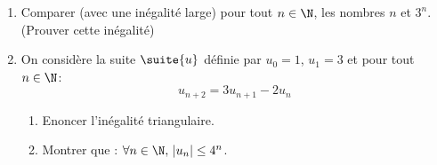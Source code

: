 


\begin{exercice}
\begin{enumerate}
\item Comparer (avec une inégalité large) pour tout $n\in \N$, les nombres $n$ et $ 3^n$. (Prouver cette inégalité) 
\item On considère la suite $\suite{u}$ définie par $u_0=1$, $u_1= 3$  et pour tout $n\in \N$:
$$u_{n+2} =3u_{n+1} -2u_n$$
\begin{enumerate}
\item Enoncer l'inégalité triangulaire.
\item Montrer que  : $\forall n\in \N,\, |u_n| \leq 4^n$. 
\end{enumerate}
\end{enumerate}
\end{exercice}


